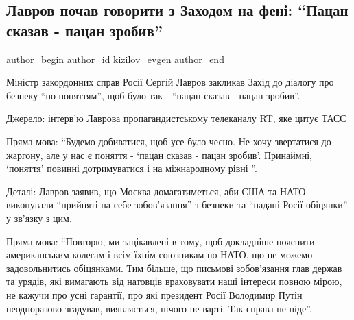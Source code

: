  
 
 
 
 
 
\subsection{Лавров почав говорити з Заходом на фені: \enquote{Пацан сказав - пацан зробив}}
\label{sec:18_02_2022.stz.news.ua.pravda.1.lavrov_pacan}
 
\ifcmt
 author_begin
   author_id kizilov_evgen
 author_end
\fi

Міністр закордонних справ Росії Сергій Лавров закликав Захід до діалогу про
безпеку \enquote{по поняттям}, щоб було так - \enquote{пацан сказав - пацан зробив}.

Джерело: інтерв'ю Лаврова пропагандистському телеканалу RT, яке цитує ТАСС


Пряма мова: \enquote{Будемо добиватися, щоб усе було чесно. Не хочу звертатися
до жаргону, але у нас є поняття - \enquote{пацан сказав - пацан зробив}.
Принаймні, \enquote{поняття} повинні дотримуватися і на міжнародному рівні }.

Деталі: Лавров заявив, що Москва домагатиметься, аби США та НАТО виконували
\enquote{прийняті на себе зобов'язання} з безпеки та \enquote{надані Росії
обіцянки} у зв'язку з цим.

Пряма мова: \enquote{Повторю, ми зацікавлені в тому, щоб докладніше пояснити
американським колегам і всім їхнім союзникам по НАТО, що не можемо
задовольнитись обіцянками. Тим більше, що письмові зобов'язання глав держав та
урядів, які вимагають від натовців враховувати наші інтереси повною мірою, не
кажучи про усні гарантії, про які президент Росії Володимир Путін неодноразово
згадував, виявляється, нічого не варті. Так справа не піде}.
